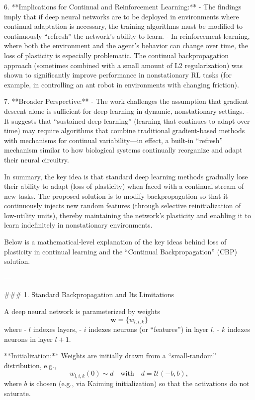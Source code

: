 6. **Implications for Continual and Reinforcement Learning:**
   - The findings imply that if deep neural networks are to be deployed in environments where continual adaptation is necessary, the training algorithms must be modified to continuously “refresh” the network’s ability to learn.
   - In reinforcement learning, where both the environment and the agent’s behavior can change over time, the loss of plasticity is especially problematic. The continual backpropagation approach (sometimes combined with a small amount of L2 regularization) was shown to significantly improve performance in nonstationary RL tasks (for example, in controlling an ant robot in environments with changing friction).

7. **Broader Perspective:**
   - The work challenges the assumption that gradient descent alone is sufficient for deep learning in dynamic, nonstationary settings.
   - It suggests that “sustained deep learning” (learning that continues to adapt over time) may require algorithms that combine traditional gradient-based methods with mechanisms for continual variability—in effect, a built-in “refresh” mechanism similar to how biological systems continually reorganize and adapt their neural circuitry.

In summary, the key idea is that standard deep learning methods gradually lose their ability to adapt (loss of plasticity) when faced with a continual stream of new tasks. The proposed solution is to modify backpropagation so that it continuously injects new random features (through selective reinitialization of low-utility units), thereby maintaining the network’s plasticity and enabling it to learn indefinitely in nonstationary environments.


Below is a mathematical‐level explanation of the key ideas behind loss of plasticity in continual learning and the “Continual Backpropagation” (CBP) solution.

---

### 1. Standard Backpropagation and Its Limitations

A deep neural network is parameterized by weights
$$
\mathbf{w} = \{w_{l,i,k}\}
$$
where
- $l$ indexes layers,
- $i$ indexes neurons (or “features”) in layer $l$,
- $k$ indexes neurons in layer $l+1$.

**Initialization:**  
Weights are initially drawn from a “small‐random” distribution, e.g.,
$$
w_{l,i,k}(0) \sim d \quad \text{with} \quad d = \mathcal{U}(-b,b),
$$
where $b$ is chosen (e.g., via Kaiming initialization) so that the activations do not saturate.

